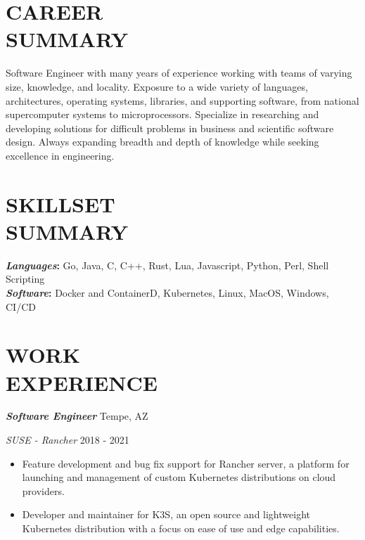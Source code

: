 \documentclass[line,margin]{res}
\renewcommand{\headrulewidth}{0pt} %
\begin{document}
\thispagestyle{empty}


\renewcommand{\headrulewidth}{0pt}

\begin{resume}

  \section{CAREER\\SUMMARY}
  Software Engineer with many years of experience working with teams of varying size, knowledge, and locality.
  Exposure to a wide variety of languages, architectures, operating systems, libraries, and supporting
  software, from national supercomputer systems to microprocessors. Specialize in researching and developing
  solutions for difficult problems in business and scientific software design. Always expanding breadth and
  depth of knowledge while seeking excellence in engineering.

  \section{SKILLSET\\SUMMARY}
          {\bf \emph{Languages}:} Go, Java, C, C++, Rust, Lua, Javascript, Python, Perl, Shell Scripting \\
          {\bf \emph{Software}:} Docker and ContainerD, Kubernetes, Linux, MacOS, Windows, CI/CD

  \section{WORK\\EXPERIENCE}
          {\bf \emph{Software Engineer}} \hfill Tempe, AZ

          {\sl SUSE - Rancher} \hfill 2018 - 2021
          \begin{itemize} \itemsep -2pt
          \item
            Feature development and bug fix support for Rancher server, a platform for launching and management of custom Kubernetes distributions on cloud providers.
          \item
            Developer and maintainer for K3S, an open source and lightweight Kubernetes distribution with a focus on ease of use and edge capabilities.
          \end{itemize}


\end{resume}
\end{document}
